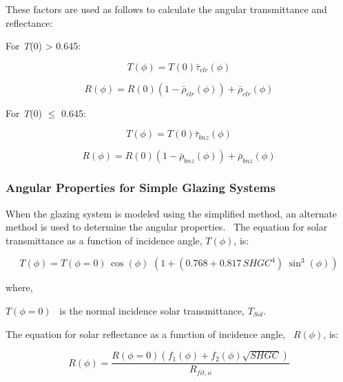 These factors are used as follows to calculate the angular transmittance and reflectance:

For \emph{T}(0) \textgreater{} 0.645:

\begin{equation}
T(\phi ) = T(0){\bar \tau_{clr}}(\phi )
\end{equation}

\begin{equation}
R(\phi ) = R(0)(1 - {\bar \rho_{clr}}(\phi )) + {\bar \rho_{clr}}(\phi )
\end{equation}

For \emph{T}(0) \(\leq\) 0.645:

\begin{equation}
T(\phi ) = T(0){\bar \tau_{bnz}}(\phi )
\end{equation}

\begin{equation}
R(\phi ) = R(0)(1 - {\bar \rho_{bnz}}(\phi )) + {\bar \rho_{bnz}}(\phi )
\end{equation}

\subsubsection{Angular Properties for Simple Glazing Systems}\label{angular-properties-for-simple-glazing-systems}

When the glazing system is modeled using the simplified method, an alternate method is used to determine the angular properties.~ The equation for solar transmittance as a function of incidence angle, \(T\left( \phi \right)\), is:

\begin{equation}
T\left( \phi  \right) = T\left( {\phi  = 0} \right)\,\cos \left( \phi  \right)\,\,\left( {1 + (0.768 + 0.817\,SHG{C^4})\;{{\sin }^3}\left( \phi  \right)} \right)
\end{equation}

where,

\(T\left( {\phi = 0} \right)\) ~is the normal incidence solar transmittance, \({T_{Sol}}\).

The equation for solar reflectance as a function of incidence angle,~ \(R\left( \phi \right)\), is:

\begin{equation}
R\left( \phi  \right) = \frac{{R\left( {\phi  = 0} \right)\left( {{f_1}\left( \phi  \right) + {f_2}\left( \phi  \right)\sqrt {SHGC} } \right)}}{{{R_{fit,o}}}}
\end{equation}

